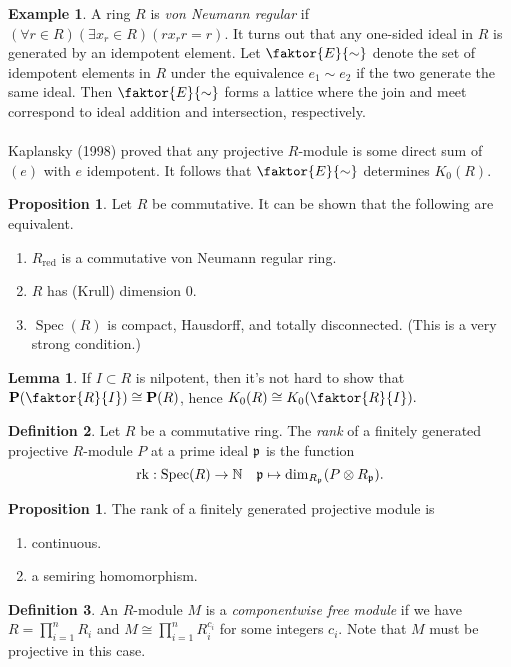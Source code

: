 \documentclass[10pt,letterpaper,cm]{nupset}
\theoremstyle{definition}
\newtheorem{definition}{Definition}
\newtheorem{exmp}[definition]{Example}
\theoremstyle{theorem}
\newtheorem{lemma}[theorem]{Lemma}
\newtheorem{prop}[theorem]{Proposition}
\theoremstyle{remark}
\newcommand{\N}{\mathbb N}
\renewcommand{\P}{\mathbf P}
\newcommand{\1}{\mathbf{1}}
\newcommand{\0}{\vec 0}
\DeclareMathOperator{\red}{red}
\DeclareMathOperator{\spec}{Spec}
\DeclareMathOperator{\rk}{rk}
\begin{document}
\begin{exmp}
A ring $R$ is \textit{von Neumann regular} if $(\forall r \in R)(\exists x_r\in R)(rx_rr=r)$. It turns out that any one-sided ideal in $R$ is generated by an idempotent element. Let $\faktor{E}{\sim}$ denote the set of idempotent elements in $R$ under the equivalence $e_1 \sim e_2$ if the two generate the same ideal. Then  $\faktor{E}{\sim}$  forms a lattice where the join and meet correspond to ideal addition and intersection, respectively.
\\ \\ Kaplansky (1998) proved that any projective $R$-module is some direct sum of $(e)$ with $e$ idempotent. It follows that $\faktor{E}{\sim}$ determines $K_0(R)$.
\end{exmp}

\begin{prop}\label{Krull}
Let $R$ be commutative. It can be shown that the following are equivalent.
\begin{enumerate}
\item $R_{\red}$ is a commutative von Neumann regular ring.
\item $R$ has (Krull) dimension $0$.
\item $\spec(R)$ is compact, Hausdorff, and totally disconnected. (This is a very strong condition.)
\end{enumerate}
\end{prop}

\begin{lemma}\label{L5}
If $I\subset R$ is nilpotent, then it's not hard to show that $\P(\faktor{R}{I}) \cong \P(R)$, hence $K_0(R) \cong K_0(\faktor{R}{I}).$
\end{lemma}

\begin{definition}
Let $R$ be a commutative ring. The \textit{rank} of a finitely generated projective $R$-module $P$ at a prime ideal $\frak{p}$ is the function $$\rk: \spec(R) \to \N \quad \frak{p} \mapsto \dim_{R_{\frak{p}}} (P \otimes R_{\frak{p}}).$$
\end{definition}
\begin{prop} The rank of a finitely generated projective module is
\begin{enumerate}
\item continuous.
\item a semiring homomorphism.
\end{enumerate}
\end{prop}

\begin{definition}
An $R$-module $M$ is a \textit{componentwise free module} if we have $R = \prod_{i=1}^n R_i$ and $M \cong \prod_{i=1}^n R_i^{c_i}$ for some integers $c_i$. Note that $M$ must be projective in this case.
\end{definition}
\end{document}

